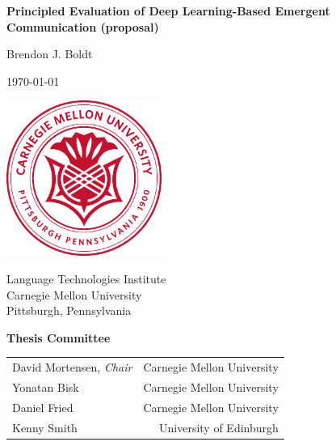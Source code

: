 \thispagestyle{title}
\begin{centering}
\textbf{\LARGE Principled Evaluation of Deep Learning-Based Emergent Communication (proposal)}

\vspace{3pc}
{\large Brendon J. Boldt}

\vspace{2pc}
\today{}

\vfill

\includegraphics[width=2in]{assets/cmu-seal-r}

\vfill

Language Technologies Institute \\
Carnegie Mellon University \\
Pittsburgh, Pennsylvania

\vspace{4pc}

\textbf{Thesis Committee}
\vspace{0.5pc}

\begin{tabular}{lr}
  David Mortensen, \emph{Chair} & Carnegie Mellon University \\
  Yonatan Bisk                  & Carnegie Mellon University \\
  Daniel Fried                  & Carnegie Mellon University \\
  Kenny Smith                   & University of Edinburgh
\end{tabular}

\end{centering}
